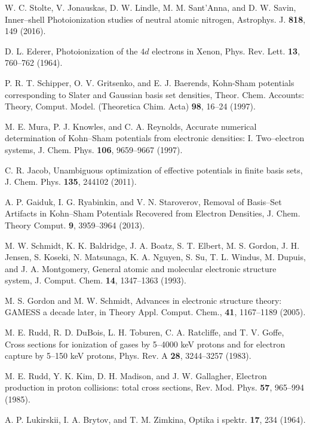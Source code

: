 \documentclass[10pt]{article}
\begin{document}
\begin{thebibliography}{10}
W. C. Stolte, V. Jonauskas, D. W. Lindle, M. M. Sant'Anna, and D. W. Savin,
Inner--shell Photoionization studies of neutral atomic nitrogen,
Astrophys. J. {\bf 818}, 149 (2016).

D. L. Ederer,
Photoionization of the $4d$ electrons in Xenon,
Phys. Rev. Lett. {\bf 13}, 760--762 (1964).

P. R. T. Schipper, O. V. Gritsenko, and E. J. Baerends,
Kohn-Sham potentials corresponding to Slater and Gaussian basis set densities,
Theor. Chem. Accounts: Theory, Comput. Model. 
(Theoretica Chim. Acta) {\bf 98}, 16--24 (1997).

M. E. Mura, P. J. Knowles, and C. A. Reynolds,
Accurate numerical determination of Kohn--Sham potentials from
electronic densities: I. Two--electron systems,
J. Chem. Phys. {\bf 106}, 9659--9667 (1997).

C. R. Jacob,
Unambiguous optimization of effective potentials in finite basis sets,
J. Chem. Phys. {\bf 135}, 244102 (2011).

A. P. Gaiduk, I. G. Ryabinkin, and V. N. Staroverov,
Removal of Basis--Set Artifacts in Kohn--Sham Potentials Recovered
from Electron Densities,
J. Chem. Theory Comput. {\bf 9}, 3959--3964 (2013).


M. W. Schmidt, K. K. Baldridge, J. A. Boatz, S. T. Elbert, M. S. Gordon,
J. H. Jensen, S. Koseki, N. Matsunaga, K. A. Nguyen, S. Su, T. L. Windus, 
M. Dupuis, and J. A. Montgomery,
General atomic and molecular electronic structure system,
J. Comput. Chem. {\bf 14}, 1347--1363 (1993).


M. S. Gordon and M. W. Schmidt,
Advances in electronic structure theory: GAMESS a decade later,
in Theory Appl. Comput. Chem., {\bf 41}, 1167--1189 (2005).

M. E. Rudd, R. D. DuBois, L. H. Toburen, C. A. Ratcliffe, and T. V. Goffe,
Cross sections for ionization of gases by 5--4000 keV protons and for
electron capture by 5--150 keV protons,
Phys. Rev. A {\bf 28}, 3244--3257 (1983).

M. E. Rudd, Y. K. Kim, D. H. Madison, and J. W. Gallagher,
Electron production in proton collisions: total cross sections,
Rev. Mod. Phys. {\bf 57}, 965--994 (1985).


A. P. Lukirskii, I. A. Brytov, and T. M. Zimkina,
Optika i spektr. {\bf 17}, 234 (1964).



\end{thebibliography}
\end{document}
